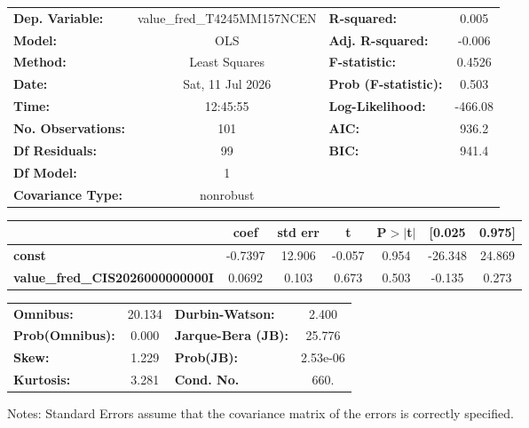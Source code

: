\begin{center}
\begin{tabular}{lclc}
\toprule
\textbf{Dep. Variable:}                 & value\_fred\_T4245MM157NCEN & \textbf{  R-squared:         } &     0.005   \\
\textbf{Model:}                         &             OLS             & \textbf{  Adj. R-squared:    } &    -0.006   \\
\textbf{Method:}                        &        Least Squares        & \textbf{  F-statistic:       } &    0.4526   \\
\textbf{Date:}                          &       Sat, 11 Jul 2026      & \textbf{  Prob (F-statistic):} &    0.503    \\
\textbf{Time:}                          &           12:45:55          & \textbf{  Log-Likelihood:    } &   -466.08   \\
\textbf{No. Observations:}              &               101           & \textbf{  AIC:               } &     936.2   \\
\textbf{Df Residuals:}                  &                99           & \textbf{  BIC:               } &     941.4   \\
\textbf{Df Model:}                      &                 1           & \textbf{                     } &             \\
\textbf{Covariance Type:}               &          nonrobust          & \textbf{                     } &             \\
\bottomrule
\end{tabular}
\begin{tabular}{lcccccc}
                                        & \textbf{coef} & \textbf{std err} & \textbf{t} & \textbf{P$> |$t$|$} & \textbf{[0.025} & \textbf{0.975]}  \\
\midrule
\textbf{const}                          &      -0.7397  &       12.906     &    -0.057  &         0.954        &      -26.348    &       24.869     \\
\textbf{value\_fred\_CIS2026000000000I} &       0.0692  &        0.103     &     0.673  &         0.503        &       -0.135    &        0.273     \\
\bottomrule
\end{tabular}
\begin{tabular}{lclc}
\textbf{Omnibus:}       & 20.134 & \textbf{  Durbin-Watson:     } &    2.400  \\
\textbf{Prob(Omnibus):} &  0.000 & \textbf{  Jarque-Bera (JB):  } &   25.776  \\
\textbf{Skew:}          &  1.229 & \textbf{  Prob(JB):          } & 2.53e-06  \\
\textbf{Kurtosis:}      &  3.281 & \textbf{  Cond. No.          } &     660.  \\
\bottomrule
\end{tabular}
\end{center}

Notes: \newline
 [1] Standard Errors assume that the covariance matrix of the errors is correctly specified.